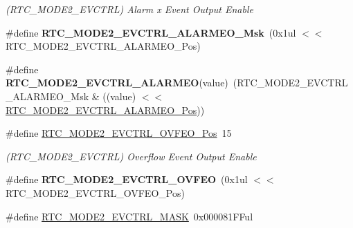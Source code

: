 \begin{DoxyCompactItemize}
\begin{DoxyCompactList}\small\item\em (R\+T\+C\+\_\+\+M\+O\+D\+E2\+\_\+\+E\+V\+C\+T\+R\+L) Alarm x Event Output Enable \end{DoxyCompactList}\item 
\hypertarget{group___s_a_m_l21___r_t_c_ga226b111bd167fd4c6309284acb18885c}{}\#define {\bfseries R\+T\+C\+\_\+\+M\+O\+D\+E2\+\_\+\+E\+V\+C\+T\+R\+L\+\_\+\+A\+L\+A\+R\+M\+E\+O\+\_\+\+Msk}~(0x1ul $<$$<$ R\+T\+C\+\_\+\+M\+O\+D\+E2\+\_\+\+E\+V\+C\+T\+R\+L\+\_\+\+A\+L\+A\+R\+M\+E\+O\+\_\+\+Pos)\label{group___s_a_m_l21___r_t_c_ga226b111bd167fd4c6309284acb18885c}

\item 
\hypertarget{group___s_a_m_l21___r_t_c_gaea51360c2d627b35b8bad72f1e1af9e1}{}\#define {\bfseries R\+T\+C\+\_\+\+M\+O\+D\+E2\+\_\+\+E\+V\+C\+T\+R\+L\+\_\+\+A\+L\+A\+R\+M\+E\+O}(value)~(R\+T\+C\+\_\+\+M\+O\+D\+E2\+\_\+\+E\+V\+C\+T\+R\+L\+\_\+\+A\+L\+A\+R\+M\+E\+O\+\_\+\+Msk \& ((value) $<$$<$ \hyperlink{group___s_a_m_l21___r_t_c_gae505cc719343ed5fc7d59e19b1eafab8}{R\+T\+C\+\_\+\+M\+O\+D\+E2\+\_\+\+E\+V\+C\+T\+R\+L\+\_\+\+A\+L\+A\+R\+M\+E\+O\+\_\+\+Pos}))\label{group___s_a_m_l21___r_t_c_gaea51360c2d627b35b8bad72f1e1af9e1}

\item 
\hypertarget{group___s_a_m_l21___r_t_c_ga619ad62637b545ab04896513ade68db7}{}\#define \hyperlink{group___s_a_m_l21___r_t_c_ga619ad62637b545ab04896513ade68db7}{R\+T\+C\+\_\+\+M\+O\+D\+E2\+\_\+\+E\+V\+C\+T\+R\+L\+\_\+\+O\+V\+F\+E\+O\+\_\+\+Pos}~15\label{group___s_a_m_l21___r_t_c_ga619ad62637b545ab04896513ade68db7}

\begin{DoxyCompactList}\small\item\em (R\+T\+C\+\_\+\+M\+O\+D\+E2\+\_\+\+E\+V\+C\+T\+R\+L) Overflow Event Output Enable \end{DoxyCompactList}\item 
\hypertarget{group___s_a_m_l21___r_t_c_ga42aa95868e98a2e9891dba026fdbafa2}{}\#define {\bfseries R\+T\+C\+\_\+\+M\+O\+D\+E2\+\_\+\+E\+V\+C\+T\+R\+L\+\_\+\+O\+V\+F\+E\+O}~(0x1ul $<$$<$ R\+T\+C\+\_\+\+M\+O\+D\+E2\+\_\+\+E\+V\+C\+T\+R\+L\+\_\+\+O\+V\+F\+E\+O\+\_\+\+Pos)\label{group___s_a_m_l21___r_t_c_ga42aa95868e98a2e9891dba026fdbafa2}

\item 
\hypertarget{group___s_a_m_l21___r_t_c_gacb787b434e007081d3bc18fb0f3f4e20}{}\#define \hyperlink{group___s_a_m_l21___r_t_c_gacb787b434e007081d3bc18fb0f3f4e20}{R\+T\+C\+\_\+\+M\+O\+D\+E2\+\_\+\+E\+V\+C\+T\+R\+L\+\_\+\+M\+A\+S\+K}~0x000081\+F\+Ful\label{group___s_a_m_l21___r_t_c_gacb787b434e007081d3bc18fb0f3f4e20}


\end{DoxyCompactItemize}
